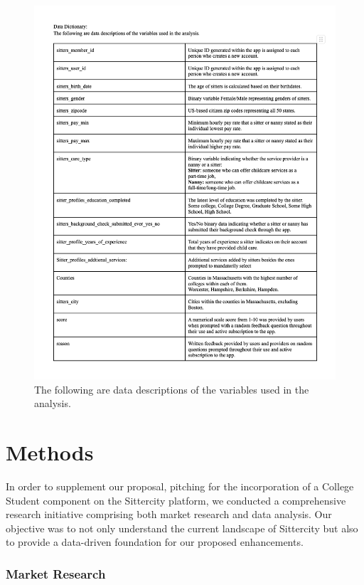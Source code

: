 \documentclass[12pt]{article}
\begin{document}
\begin{figure}
\centering
\includegraphics{IMAGES/data_dictionary.png}
\caption{The following are data descriptions of the variables used in
the analysis.}
\end{figure}

\newpage

\hypertarget{methods}{%
\section{Methods}\label{methods}}

In order to supplement our proposal, pitching for the incorporation of a
College Student component on the Sittercity platform, we conducted a
comprehensive research initiative comprising both market research and
data analysis. Our objective was to not only understand the current
landscape of Sittercity but also to provide a data-driven foundation for
our proposed enhancements.

\hypertarget{market-research}{%
\subsubsection{Market Research}\label{market-research}}
\end{document}

